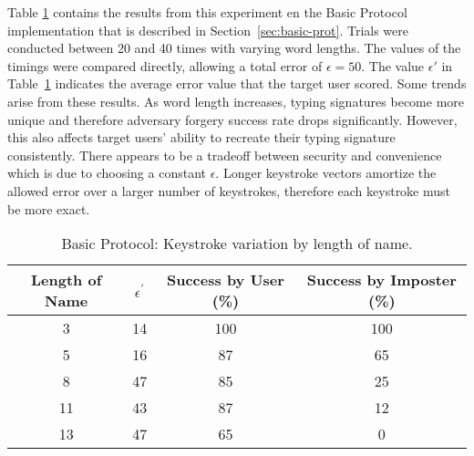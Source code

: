 \documentclass[11pt]{article}
\begin{document}
Table \ref{table:res-basic} contains the results from this experiment en the Basic Protocol implementation that is described in Section~\ref{sec:basic-prot}. Trials were conducted between 20 and 40 times with varying word lengths. The values of the timings were compared directly, allowing a total error of $\epsilon=50$. The value $\epsilon'$ in Table~\ref{table:res-basic} indicates the average error value that the target user scored. Some trends arise from these results. As word length increases, typing signatures become more unique and therefore adversary forgery success rate drops significantly. However, this also affects target users' ability to recreate their typing signature consistently. There appears to be a tradeoff between security and convenience which is due to choosing a constant $\epsilon$. Longer keystroke vectors amortize the allowed error over a larger number of keystrokes, therefore each keystroke must be more exact.

\begin{table}[h!]
\centering
\begin{tabular}{|c c c c|} 
 \hline
 Length of Name & $\epsilon^{'}$ & Success by User (\%) & Success by Imposter (\%) \\ [0.5ex] 
 \hline\hline
 3 & 14 & 100 & 100 \\ 
 5 & 16 & 87 & 65 \\
 8 & 47 & 85 & 25 \\ 
 11 & 43 & 87 & 12 \\
 13 & 47 & 65 & 0 \\ [1ex] 
 \hline
\end{tabular}
\caption{Basic Protocol: Keystroke variation by length of name.}
\label{table:res-basic}
\end{table}
\end{document}
